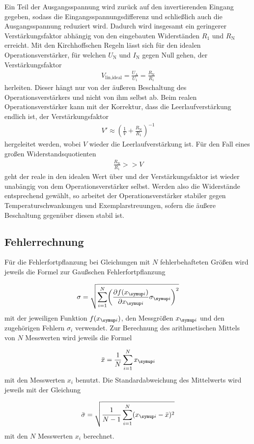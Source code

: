 Ein Teil der Ausgangsspannung wird zurück auf den invertierenden Eingang gegeben, sodass die Eingangsspannungsdifferenz
und schließlich auch die Ausgangsspannung reduziert wird. Dadurch wird insgesamt ein geringerer Verstärkungsfaktor abhängig von
den eingebauten Widerständen $R_1$ und $R_\text{N}$ erreicht. Mit den Kirchhoffschen Regeln lässt sich für den idealen
Operationsverstärker, für welchen $U_\text{N}$ und $I_\text{N}$ gegen Null gehen, der Verstärkungsfaktor
\begin{align}
  V_\text{lin,ideal} = \frac{U_\text{A}}{U_\text{1}} = \frac{R_\text{N}}{R_1}
\end{align}
herleiten. Dieser hängt nur von der äußeren Beschaltung des Operationsverstärkers und nicht von ihm selbst ab.
Beim realen Operationsverstärker kann mit der Korrektur, dass die Leerlaufverstärkung endlich ist, der
Verstärkungsfaktor
\begin{align}
  V' \approx \left( \frac1{V} + \frac{R_\text{N}}{R_1} \right)^{-1}
\end{align}
hergeleitet werden, wobei $V$ wieder die Leerlaufverstärkung ist. Für den Fall eines großen Widerstandsquotienten
\begin{align}
  \frac{R_\text{N}}{R_1} >> V
\end{align}
geht der reale in den idealen Wert über und der Verstärkungsfaktor ist wieder unabängig von dem Operationsverstärker selbst.
Werden also die Widerstände entsprechend gewählt, so arbeitet der Operationsverstärker stabiler gegen Temperaturschwankungen
und Exemplarstreuungen, sofern die äußere Beschaltung gegenüber diesen stabil ist.




\subsection{Fehlerrechnung}

Für die Fehlerfortpflanzung bei Gleichungen mit $N$ fehlerbehafteten Größen
wird jeweils die Formel zur Gaußschen Fehlerfortpflanzung

\begin{equation*}
  \sigma = \sqrt{\sum_{i=1}^{N}\biggl(\frac{\partial f(x_{\g{i}})}{\partial x_{\g{i}}}
  \sigma_{\g{i}}\biggr)^2}
\end{equation*}
mit der jeweiligen Funktion $f(x_{\g{i}})$, den Messgrößen $x_{\g{i}}$ und den
zugehörigen Fehlern $\sigma_i$ verwendet.
Zur Berechnung des arithmetischen Mittels von $N$ Messwerten wird jeweils die
Formel

\begin{equation*}
  \bar{x} = \frac{1}{N}\sum_{i=1}^{N}x_{\g{i}}
\end{equation*}
mit den Messwerten $x_i$ benutzt.
Die Standardabweichung des Mittelwerts wird jeweils mit der Gleichung

\begin{equation*}
  \bar{\sigma} = \sqrt{\frac{1}{N-1}\sum_{i=1}^{N}(x_{\g{i}} - \bar{x})^2}
\end{equation*}
mit den $N$ Messwerten $x_i$ berechnet.


\cite{anleitung}
